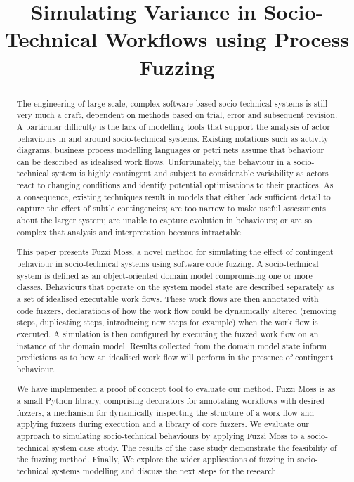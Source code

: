 \documentclass{sig-alternate}
\title{Simulating Variance in Socio-Technical Workflows using Process Fuzzing}
\begin{document}

\maketitle


\begin{abstract}
  The engineering of large scale, complex software based socio-technical systems
  is still very much a craft, dependent on methods based on trial, error and
  subsequent revision.  A particular difficulty is the lack of modelling tools
  that support the analysis of actor behaviours in and around socio-technical
  systems.  Existing notations such as activity diagrams, business process
  modelling languages or petri nets assume that behaviour can be described as
  idealised work flows.  Unfortunately, the behaviour in a socio-technical
  system is highly contingent and subject to considerable variability as actors
  react to changing conditions and identify potential optimisations to their
  practices.  As a consequence, existing techniques result in models that either
  lack sufficient detail to capture the effect of subtle contingencies; are too
  narrow to make useful assessments about the larger system; are unable to
  capture evolution in behaviours; or are so complex that analysis and
  interpretation becomes intractable.

  This paper presents Fuzzi Moss, a novel method for simulating the effect of
  contingent behaviour in socio-technical systems using software code fuzzing.
  A socio-technical system is defined as an object-oriented domain model
  compromising one or more classes.  Behaviours that operate on the system model
  state are described separately as a set of idealised executable work flows.
  These work flows are then annotated with code fuzzers, declarations of how the
  work flow could be dynamically altered (removing steps, duplicating steps,
  introducing new steps for example) when the work flow is executed.  A
  simulation is then configured by executing the fuzzed work flow on an instance
  of the domain model.  Results collected from the domain model state inform
  predictions as to how an idealised work flow will perform in the presence of
  contingent behaviour.
 
  We have implemented a proof of concept tool to evaluate our method. Fuzzi Moss
  is as a small Python library, comprising decorators for annotating workflows
  with desired fuzzers, a mechanism for dynamically inspecting the structure of
  a work flow and applying fuzzers during execution and a library of core
  fuzzers.  We evaluate our approach to simulating socio-technical behaviours by
  applying Fuzzi Moss to a socio-technical system case study.  The results of
  the case study demonstrate the feasibility of the fuzzing method.  Finally, We
  explore the wider applications of fuzzing in socio-technical systems modelling
  and discuss the next steps for the research.
\end{abstract}
\end{document}
